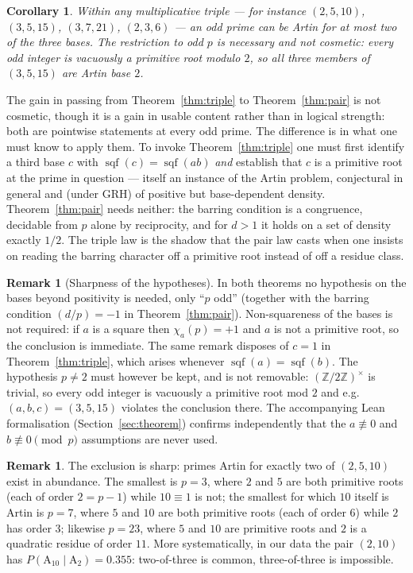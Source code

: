 \documentclass[11pt,reqno]{amsart}
\theoremstyle{plain}
\newtheorem{corollary}[theorem]{Corollary}
\theoremstyle{definition}
\newtheorem{remark}[theorem]{Remark}
\DeclareMathOperator{\sqf}{sqf}
\newcommand{\Art}{\mathrm{A}}
\newcommand{\Z}{\mathbb{Z}}
\begin{document}
\begin{corollary}
\label{cor:twoofthree}
Within any multiplicative triple --- for instance $(2, 5, 10)$, $(3, 5, 15)$,
$(3, 7, 21)$, $(2, 3, 6)$ --- an \emph{odd} prime can be Artin for at most two
of the three bases. The restriction to odd $p$ is necessary and not cosmetic:
every odd integer is vacuously a primitive root modulo $2$, so all three
members of $(3,5,15)$ are Artin base $2$.
\end{corollary}

The gain in passing from Theorem~\ref{thm:triple} to Theorem~\ref{thm:pair} is
not cosmetic, though it is a gain in usable content rather than in logical
strength: both are pointwise statements at every odd prime. The difference is
in what one must know to apply them. To invoke
Theorem~\ref{thm:triple} one must first identify a third base $c$ with
$\sqf(c) = \sqf(ab)$ \emph{and} establish that $c$ is a primitive root at the
prime in question --- itself an instance of the Artin problem, conjectural in
general and (under GRH) of positive but base-dependent density.
Theorem~\ref{thm:pair} needs neither: the barring condition is a congruence,
decidable from $p$ alone by reciprocity, and for $d > 1$ it holds on a set of
density exactly $1/2$. The triple law is the shadow that the pair law casts when
one insists on reading the barring character off a primitive root instead of off
a residue class.

\begin{remark}[Sharpness of the hypotheses]
In both theorems no hypothesis on the bases beyond positivity is needed, only ``$p$ odd'' (together with the barring condition $(d/p) = -1$ in Theorem~\ref{thm:pair}). Non-squareness of the bases is not
required: if $a$ is a square then $\chi_a(p) = +1$ and $a$ is not a primitive
root, so the conclusion is immediate. The same remark disposes of $c = 1$ in
Theorem~\ref{thm:triple}, which arises whenever $\sqf(a) = \sqf(b)$. The
hypothesis $p \ne 2$ must however be kept, and is not removable:
$(\Z/2\Z)^\times$ is trivial, so every odd integer is vacuously a primitive
root mod $2$ and e.g.\ $(a,b,c) = (3,5,15)$ violates the conclusion there. The accompanying Lean formalisation (Section~\ref{sec:theorem}) confirms
independently that the $a \not\equiv 0$ and $b \not\equiv 0 \pmod p$
assumptions are never used.
\end{remark}

\begin{remark}
The exclusion is sharp: primes Artin for exactly two of $(2,5,10)$ exist in
abundance. The smallest is $p = 3$, where $2$ and $5$ are both primitive roots
(each of order $2 = p-1$) while $10 \equiv 1$ is not; the smallest for which
$10$ itself is Artin is $p = 7$, where $5$ and $10$ are both primitive
roots (each of order $6$) while $2$ has order $3$; likewise $p = 23$, where
$5$ and $10$ are primitive roots and $2$ is a quadratic residue of order
$11$. More systematically, in our data the pair
$(2, 10)$ has $P(\Art_{10} \mid \Art_2) = 0.355$: two-of-three is common,
three-of-three is impossible.
\end{remark}
\end{document}
